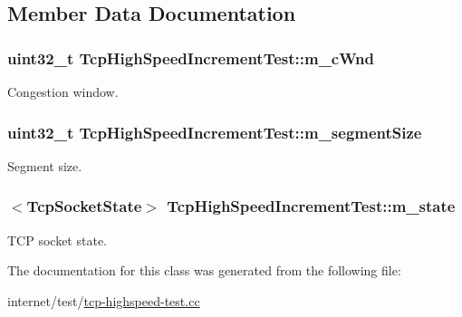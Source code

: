 \subsection{Member Data Documentation}
\subsubsection[{\texorpdfstring{m\+\_\+c\+Wnd}{m_cWnd}}]{\setlength{\rightskip}{0pt plus 5cm}uint32\+\_\+t Tcp\+High\+Speed\+Increment\+Test\+::m\+\_\+c\+Wnd\hspace{0.3cm}{\ttfamily [private]}}\hypertarget{classTcpHighSpeedIncrementTest_a97d44cf5a9831a44e41e292241c71e1a}{}\label{classTcpHighSpeedIncrementTest_a97d44cf5a9831a44e41e292241c71e1a}


Congestion window. 

\subsubsection[{\texorpdfstring{m\+\_\+segment\+Size}{m_segmentSize}}]{\setlength{\rightskip}{0pt plus 5cm}uint32\+\_\+t Tcp\+High\+Speed\+Increment\+Test\+::m\+\_\+segment\+Size\hspace{0.3cm}{\ttfamily [private]}}\hypertarget{classTcpHighSpeedIncrementTest_a2df13eec369c2568c2ede7a3a28f6214}{}\label{classTcpHighSpeedIncrementTest_a2df13eec369c2568c2ede7a3a28f6214}


Segment size. 

\subsubsection[{\texorpdfstring{m\+\_\+state}{m_state}}]{$<${\bf Tcp\+Socket\+State}$>$ Tcp\+High\+Speed\+Increment\+Test\+::m\+\_\+state\hspace{0.3cm}{\ttfamily [private]}}\hypertarget{classTcpHighSpeedIncrementTest_a05ee6e08927808018c90795bb93843f0}{}\label{classTcpHighSpeedIncrementTest_a05ee6e08927808018c90795bb93843f0}


T\+CP socket state. 



The documentation for this class was generated from the following file\+:\begin{DoxyCompactItemize}
\item 
internet/test/\hyperlink{tcp-highspeed-test_8cc}{tcp-\/highspeed-\/test.\+cc}\end{DoxyCompactItemize}
